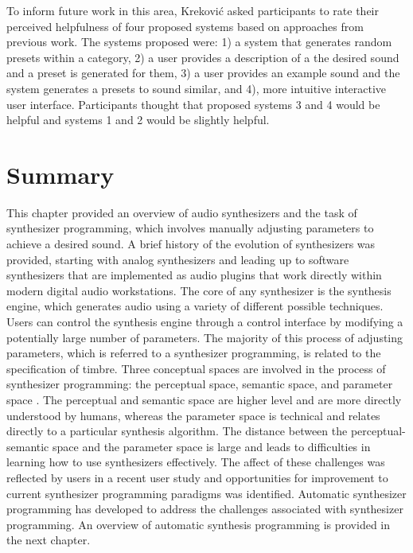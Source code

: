 To inform future work in this area, Krekovi\'{c} asked participants to rate their perceived helpfulness of four proposed systems based on approaches from previous work. The systems proposed were: 1) a system that generates random presets within a category, 2) a user provides a description of a the desired sound and a preset is generated for them, 3) a user provides an example sound and the system generates a presets to sound similar, and 4), more intuitive interactive user interface. Participants thought that proposed systems 3 and 4 would be helpful and systems 1 and 2 would be slightly helpful.

\section{Summary}
This chapter provided an overview of audio synthesizers and the task of synthesizer programming, which involves manually adjusting parameters to achieve a desired sound. A brief history of the evolution of synthesizers was provided, starting with analog synthesizers and leading up to software synthesizers that are implemented as audio plugins that work directly within modern digital audio workstations. The core of any synthesizer is the synthesis engine, which generates audio using a variety of different possible techniques. Users can control the synthesis engine through a control interface by modifying a potentially large number of parameters. The majority of this process of adjusting parameters, which is referred to a synthesizer programming, is related to the specification of timbre. Three conceptual spaces are involved in the process of synthesizer programming: the perceptual space, semantic space, and parameter space \cite{pardo2019learning}. The perceptual and semantic space are higher level and are more directly understood by humans, whereas the parameter space is technical and relates directly to a particular synthesis algorithm. The distance between the perceptual-semantic space and the parameter space is large and leads to difficulties in learning how to use synthesizers effectively. The affect of these challenges was reflected by users in a recent user study \cite{krekovic2019insights} and opportunities for improvement to current synthesizer programming paradigms was identified. Automatic synthesizer programming has developed to address the challenges associated with synthesizer programming. An overview of automatic synthesis programming is provided in the next chapter.